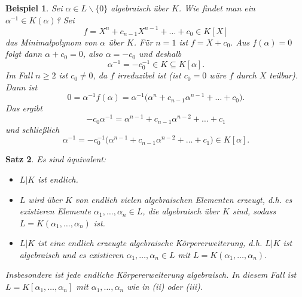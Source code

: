 \documentclass[a4paper, twoside, 11pt, ngerman]{report}
\renewcommand{\setminus}{\smallsetminus}
\theoremstyle{definistyle}
\newtheorem{satz}{Satz}[section]
\newtheorem{bsp}[satz]{Beispiel}
\theoremstyle{remark}
\begin{document}
\begin{bsp}\label{bsp:invers_koerpererweiterung}
Sei $\alpha \in L\setminus\{0\}$ algebraisch über $K$. Wie findet man ein $\alpha^{-1} \in K(\alpha)$?
Sei \[f = X^n + c_{n-1} X^{n-1} + \dots + c_0 \in K[X]\] das Minimalpolynom von $\alpha$ über $K$.
Für $n = 1$ ist $f = X + c_0$. Aus $f(\alpha) = 0$ folgt dann $\alpha + c_0 = 0$, also $\alpha = -c_0$ und deshalb \[\alpha^{-1} = -c_0^{-1} \in K \subseteq K[\alpha].\]
Im Fall $n \geq 2$ ist $c_0 \neq 0$, da $f$ irreduzibel ist (ist $c_0=0$ wäre $f$ durch $X$ teilbar). Dann ist
\[
0 = \alpha^{-1} f(\alpha) = \alpha^{-1} \big(\alpha^n + c_{n-1} \alpha^{n-1} + \dots + c_0 \big).
\]
Das ergibt
\[
-c_0 \alpha^{-1} = \alpha^{n-1} + c_{n-1} \alpha^{n-2} + \dots + c_1
\]
und schließlich
\[
\alpha^{-1} = -c_0^{-1} \big(\alpha^{n-1} + c_{n-1} \alpha^{n-2} + \dots + c_1\big) \in K[\alpha].
\]
\end{bsp}

\begin{satz}\label{satz:endl_erweiterung_aquivalenzen}
Es sind äquivalent:
\begin{itemize}
    \item[(i)] $L|K$ ist endlich.
    \item[(ii)] $L$ wird über $K$ von endlich vielen algebraischen Elementen erzeugt, d.h. es existieren Elemente $\alpha_1, \dots, \alpha_n \in L$, die algebraisch über $K$ sind, sodass $L = K(\alpha_1, \dots, \alpha_n)$ ist.
    \item[(iii)] $L|K$ ist eine endlich erzeugte algebraische Körpererweiterung, d.h. $L|K$ ist algebraisch und es existieren $\alpha_1, \dots, \alpha_n \in L$ mit $L = K(\alpha_1, \dots, \alpha_n)$.
\end{itemize}
Insbesondere ist jede endliche Körpererweiterung algebraisch. In diesem Fall ist $L = K[\alpha_1, \dots, \alpha_n]$ mit $\alpha_1, \dots, \alpha_n$ wie in (ii) oder (iii).
\end{satz}
\end{document}
